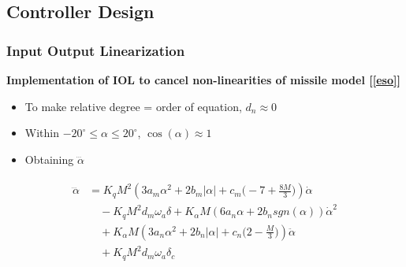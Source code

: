 \documentclass[table,10pt,red]{beamer}	%
\begin{document}
\subsection{Controller Design} %
\begin{frame}
	\frametitle{Input Output Linearization}
	\textbf{Implementation of IOL to cancel non-linearities of missile model [\ref{eso}]} 
	\begin{itemize}
		\item To make relative degree = order of equation, $d_n \approx 0$
		\item Within $-20^\circ\le \alpha \le20^\circ$, $\cos(\alpha) \approx 1$
		\item Obtaining $\dddot{\alpha}$
	\end{itemize}

\begin{eqnarray*}
\begin{aligned}
	\dddot{\alpha}&=K_q M^2(3a_m\alpha^2+2b_m|\alpha|+c_m\Big(-7+\frac{8M}{3}\Big))\dot{\alpha}\\ 
	&\quad - K_q M^2d_m\omega_a\delta+K_{\alpha}M(6a_n\alpha+2b_n sgn(\alpha))\dot{\alpha}^2\\ 
	&\quad + K_\alpha M(3a_n\alpha^2+2b_n|\alpha|+c_n\Big(2-\frac{M}{3}\Big))\ddot{\alpha}\\ 
	&\quad + K_q M^2d_m\omega_a\delta_c \label{a3dot}
\end{aligned}
\label{eq4}
\end{eqnarray*}

\end{frame}
\end{document}
